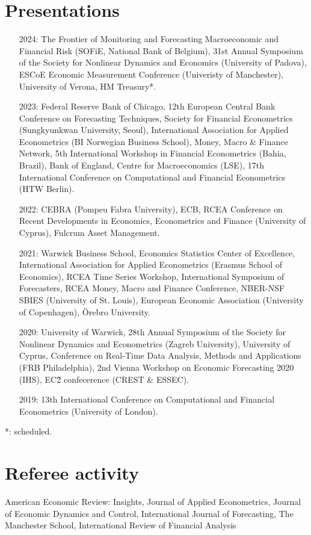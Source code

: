 \documentclass[a4paper,12pt]{article}
\begin{document}
\section{Presentations}
\begin{itemize}
    \item[2024:] The Frontier of Monitoring and Forecasting Macroeconomic and Financial Risk (SOFiE, National Bank of Belgium), 31st Annual Symposium of the Society for Nonlinear Dynamics and Economics (University of Padova), ESCoE Economic Measurement Conference (Univeristy of Manchester), University of Verona, HM Treasury*.
    \item[2023:] Federal Reserve Bank of Chicago, 12th European Central Bank Conference on Forecasting Techniques, Society for Financial Econometrics (Sungkyunkwan University, Seoul), International Association for Applied Econometrics (BI Norwegian Business School), Money, Macro \& Finance Network, 5th International Workshop in Financial Econometrics (Bahia, Brazil), Bank of England, Centre for Macroeconomics (LSE), 17th International Conference on Computational and Financial Econometrics (HTW Berlin). 
    \item[2022:] CEBRA (Pompeu Fabra University), ECB, RCEA Conference on Recent Developments in Economics, Econometrics and Finance (University of Cyprus), Fulcrum Asset Management.
    \item[2021:] Warwick Business School, Economics Statistics Center of Excellence, International Association for Applied Econometrics (Erasmus School of Economics),  RCEA Time Series Workshop, International Symposium of Forecasters,  RCEA Money, Macro and Finance Conference, NBER-NSF SBIES (University of St. Louis), European Economic Association (University of Copenhagen), \"Orebro University.
    \item[2020:] University of Warwick, 28th Annual Symposium of the Society for Nonlinear Dynamics and Econometrics (Zagreb University), University of Cyprus, Conference on Real-Time Data Analysis, Methods and Applications (FRB Philadelphia), 2nd Vienna Workshop on Economic Forecasting 2020 (IHS), EC\^2 confecerence (CREST \& ESSEC).
    \item[2019:] 13th International Conference on Computational and Financial Econometrics (University of London).
\end{itemize}
*: scheduled.

\section{Referee activity}
American Economic Review: Insights, Journal of Applied Econometrics, Journal of Economic Dynamics and Control, International Journal of Forecasting, The Manchester School, International Review of Financial Analysis
\end{document}
